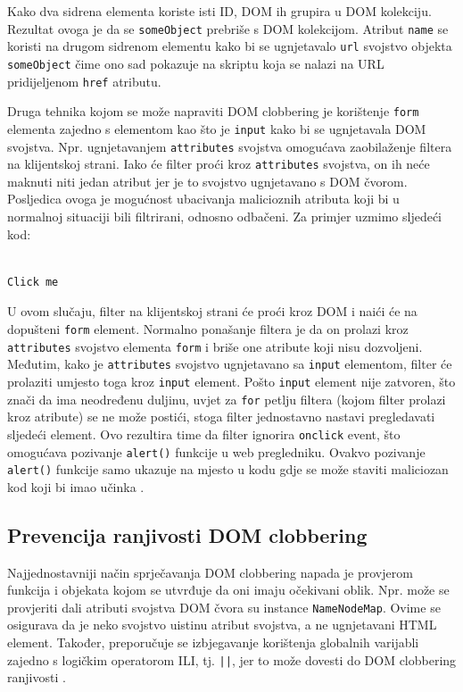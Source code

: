 \documentclass[12pt, oneside, onecolumn]{book}
\begin{document}
{\begin{verbatim}
\end{verbatim}

Kako dva sidrena elementa koriste isti ID, DOM ih grupira u DOM kolekciju. Rezultat ovoga je da se \texttt{someObject} prebriše s DOM kolekcijom. Atribut \texttt{name} se koristi na drugom sidrenom elementu kako bi se ugnjetavalo \texttt{url} svojstvo objekta \texttt{someObject} čime ono sad pokazuje na skriptu koja se nalazi na URL pridijeljenom \texttt{href} atributu.

Druga tehnika kojom se može napraviti DOM clobbering je korištenje \texttt{form} elementa zajedno s elementom kao što je \texttt{input} kako bi se ugnjetavala DOM svojstva. Npr. ugnjetavanjem \texttt{attributes} svojstva omogućava zaobilaženje filtera na klijentskoj strani. Iako će filter proći kroz \texttt{attributes} svojstva, on ih neće maknuti niti jedan atribut jer je to svojstvo ugnjetavano s DOM čvorom. Posljedica ovoga je mogućnost ubacivanja malicioznih atributa koji bi u normalnoj situaciji bili filtrirani, odnosno odbačeni. Za primjer uzmimo sljedeći kod:

\begin{verbatim}

Click me
\end{verbatim}

U ovom slučaju, filter na klijentskoj strani će proći kroz DOM i naići će na dopušteni \texttt{form} element. Normalno ponašanje filtera je da on prolazi kroz \texttt{attributes} svojstvo elementa \texttt{form} i briše one atribute koji nisu dozvoljeni. Međutim, kako je \texttt{attributes} svojstvo ugnjetavano sa \texttt{input} elementom, filter će prolaziti umjesto toga kroz \texttt{input} element. Pošto \texttt{input} element nije zatvoren, što znači da ima neodređenu duljinu, uvjet za \texttt{for} petlju filtera (kojom filter prolazi kroz atribute) se ne može postići, stoga filter jednostavno nastavi pregledavati sljedeći element. Ovo rezultira time da filter ignorira \texttt{onclick} event, što omogućava pozivanje \texttt{alert()} funkcije u web pregledniku. Ovakvo pozivanje \texttt{alert()} funkcije samo ukazuje na mjesto u kodu gdje se može staviti maliciozan kod koji bi imao učinka \cite{domnapad}.

\subsection{Prevencija ranjivosti DOM clobbering}
Najjednostavniji način sprječavanja DOM clobbering napada je provjerom funkcija i objekata kojom se utvrđuje da oni imaju očekivani oblik. Npr. može se provjeriti dali atributi svojstva DOM čvora su instance \texttt{NameNodeMap}. Ovime se osigurava da je neko svojstvo uistinu atribut svojstva, a ne ugnjetavani HTML element. Također, preporučuje se izbjegavanje korištenja globalnih varijabli zajedno s logičkim operatorom ILI, tj. \texttt{||}, jer to može dovesti do DOM clobbering ranjivosti \cite{domclob}.

}
\end{document}
